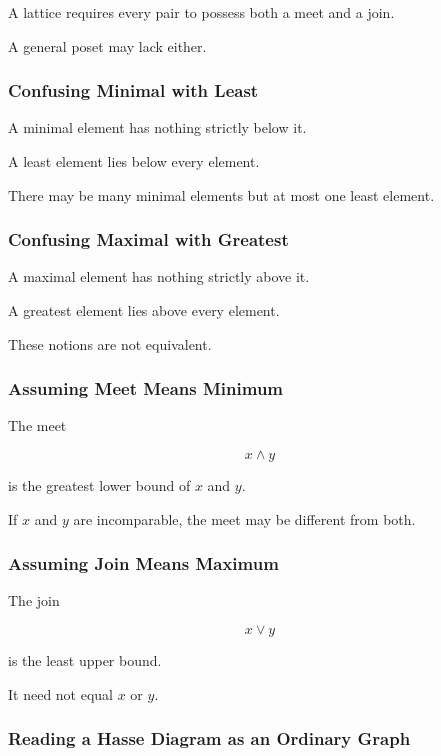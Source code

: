 A lattice requires every pair to possess both a meet and a join.

A general poset may lack either.

\subsubsection{Confusing Minimal with Least}

A minimal element has nothing strictly below it.

A least element lies below every element.

There may be many minimal elements but at most one least element.

\subsubsection{Confusing Maximal with Greatest}

A maximal element has nothing strictly above it.

A greatest element lies above every element.

These notions are not equivalent.

\subsubsection{Assuming Meet Means Minimum}

The meet

\[ x\wedge y \]

is the greatest lower bound of \(x\) and \(y\).

If \(x\) and \(y\) are incomparable, the meet may be different from both.

\subsubsection{Assuming Join Means Maximum}

The join

\[ x\vee y \]

is the least upper bound.

It need not equal \(x\) or \(y\).

\subsubsection{Reading a Hasse Diagram as an Ordinary Graph}

